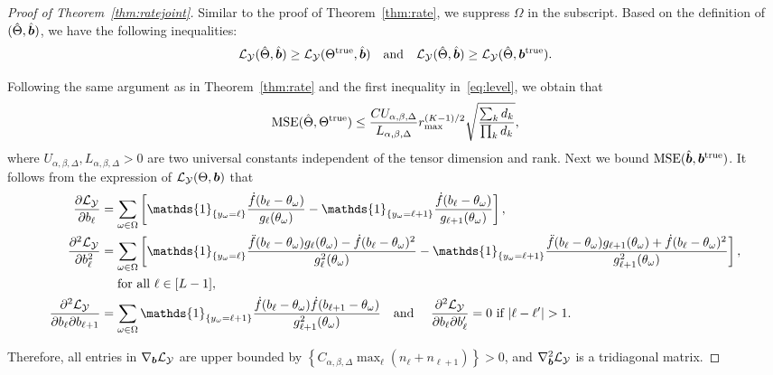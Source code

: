 \documentclass[11pt]{article}
\theoremstyle{plain}
\theoremstyle{definition}
\begin{document}
\begin{proof}[Proof of Theorem~\ref{thm:ratejoint}]
Similar to the proof of Theorem~\ref{thm:rate}, we suppress $\Omega$ in the subscript. Based on the definition of $(\hat \Theta, \hat {\bm{b}})$,
we have the following inequalities:
\begin{equation}\label{eq:level}
\mathcal{L}_{\mathcal{Y}}(\hat \Theta,\hat {\bm{b}})\geq \mathcal{L}_{\mathcal{Y}}(\Theta^{\mathrm{true}},\hat {\bm{b}})\quad \text{and}\quad \mathcal{L}_{\mathcal{Y}}(\hat \Theta,\hat {\bm{b}})\geq \mathcal{L}_{\mathcal{Y}}(\hat \Theta, \bm{b}^{\mathrm{true}}).
\end{equation}

Following the same argument as in Theorem~\ref{thm:rate} and the first inequality in~\eqref{eq:level}, we obtain that
\begin{equation}\label{eq:ratenew}
\text{MSE}(\hat \Theta, \Theta^{\mathrm{true}})\leq {CU_{\alpha,\beta,\Delta}\over L_{\alpha,\beta,\Delta}} r_{\max}^{(K-1)/2}  \sqrt{ \sum_k d_k \over \prod_k d_k},
\end{equation}
where $U_{\alpha,\beta,\Delta}, L_{\alpha,\beta,\Delta}>0$ are two universal constants independent of the tensor dimension and rank.
Next we bound $\text{MSE}(\hat {\bm{b}},\bm{b}^{\mathrm{true}})$. It follows from the expression of $\mathcal{L}_{\mathcal{Y}}(\Theta,\bm{b})$ that
\begin{align}\label{eq:property}
{\partial \flogl\over \partial b_\ell}&=\sum_{\omega\in\Omega}\left[\mathds{1}_{\{y_{\omega}=\ell\}}
\frac{\dot{f}(b_\ell-\theta_\omega)}{g_\ell(\theta_\omega)}-\mathds{1}_{\{y_{\omega}=\ell+1\}}
\frac{\dot{f}(b_\ell-\theta_\omega)}{g_{\ell+1}(\theta_\omega)}\right],\notag\\
{\partial^2 \flogl\over \partial b_\ell^2}&=\sum_{\omega\in\Omega}\left[\mathds{1}_{\{y_\omega=\ell\}}\frac{\ddot{f}(b_\ell-\theta_\omega)g_\ell(\theta_\omega)-\dot{f}(b_\ell-\theta_\omega)^2}{g^2_\ell(\theta_\omega)}-\mathds{1}_{\{y_\omega=\ell+1\}}\frac{\ddot{f}(b_\ell-\theta_\omega)g_{\ell+1}(\theta_\omega)+\dot{f}(b_\ell-\theta_\omega)^2}{g^2_{\ell+1}(\theta_\omega)}\right],\notag\\
&\quad  \text{ for all } \ell \in [L-1],\notag \\
{\partial^2 \flogl\over \partial b_\ell \partial b_{\ell+1}}&=\sum_{\omega\in\Omega}\mathds{1}_{\{y_\omega=\ell+1\}}\frac{\dot{f}(b_\ell-\theta_\omega)\dot{f}(b_{\ell+1}-\theta_\omega)}{g^2_{\ell+1}(\theta_\omega)}\quad \text{and}\quad
\ {\partial^2 \flogl\over \partial b_\ell \partial b_\ell'} = 0 \text{ if } |\ell-\ell'|>1.
\end{align}

Therefore, all entries in $\nabla_{\bm{b}}\mathcal{L}_{\mathcal{Y}}$ are upper bounded by $\left\{C_{\alpha,\beta,\Delta} \max_\ell (n_\ell+n_{\ell+1})\right\}>0$, and $\nabla^2_{\bm{b}}\mathcal{L}_{\mathcal{Y}}$ is a tridiagonal matrix.


\end{proof}
\end{document}
